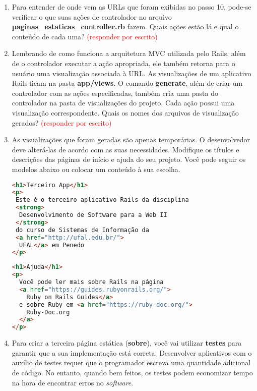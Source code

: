 \documentclass[a4paper,12pt]{article}
\begin{document}
\begin{enumerate}
  \item Para entender de onde vem as URLs que foram exibidas no passo 10, pode-se verificar o que suas ações de controlador no arquivo \textbf{paginas\_estaticas\_controller.rb} fazem. Quais ações estão lá e qual o conteúdo de cada uma? \textcolor{red}{(responder por escrito)}
  \item Lembrando de como funciona a arquitetura MVC utilizada pelo Rails, além de o controlador executar a ação apropriada, ele também retorna para o usuário uma visualização associada à URL. As visualizações de um aplicativo Rails ficam na pasta \textbf{app/views}. O comando \textbf{generate}, além de criar um controlador com as ações especificadas, também cria uma pasta do controlador na pasta de visualizações do projeto. Cada ação possui uma visualização correspondente. Quais os nomes dos arquivos de visualização gerados? \textcolor{red}{(responder por escrito)}
  \item As visualizações que foram geradas são apenas temporárias. O desenvolvedor deve alterá-las de acordo com as suas necessidades. Modifique os títulos e descrições das páginas de início e ajuda do seu projeto. Você pode seguir os modelos abaixo ou colocar um conteúdo à sua escolha.

  \begin{lstlisting}[language=html, title=app/views/paginas\_estaticas/inicio.html.erb]
<h1>Terceiro App</h1>
<p>
 Este é o terceiro aplicativo Rails da disciplina
 <strong>
  Desenvolvimento de Software para a Web II
 </strong>
 do curso de Sistemas de Informação da
 <a href="http://ufal.edu.br/">
  UFAL</a> em Penedo
</p>
  \end{lstlisting}

  \begin{lstlisting}[language=html, title=app/views/paginas\_estaticas/ajuda.html.erb]
<h1>Ajuda</h1>
<p>
  Você pode ler mais sobre Rails na página
  <a href="https://guides.rubyonrails.org/">
    Ruby on Rails Guides</a>
  e sobre Ruby em <a href="https://ruby-doc.org/">
    Ruby-Doc.org
  </a>
</p>
  \end{lstlisting}

  \item Para criar a terceira página estática (\textbf{sobre}), você vai utilizar \textbf{testes} para garantir que a sua implementação está correta. Desenvolver aplicativos com o auxílio de testes requer que o programador escreva uma quantidade adicional de código. No entanto, quando bem feitos, os testes podem economizar tempo na hora de encontrar erros no \textit{software}.


\end{enumerate}
\end{document}
